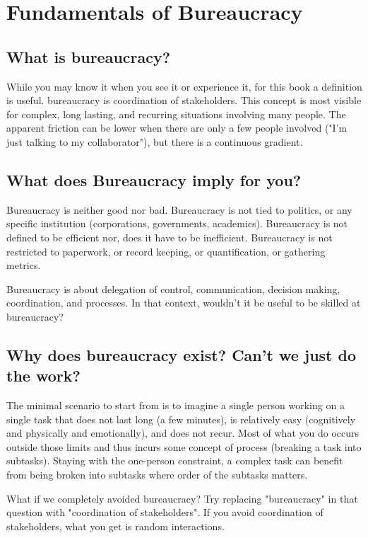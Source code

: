 \section{Fundamentals of Bureaucracy}

\subsection{What is bureaucracy?}
While you may know it when you see it or experience it, for this book a definition is useful. 
\gls{bureaucracy} is coordination of stakeholders. This concept is most visible for complex, long lasting, and recurring situations involving many people. The apparent friction can be lower when there are only a few people involved ("I'm just talking to my collaborator"), but there is a continuous gradient. 

\subsection{What does Bureaucracy imply for you?}
Bureaucracy is neither good nor bad. Bureaucracy is not tied to politics, or any specific institution (corporations, governments, academics). Bureaucracy is not defined to be efficient nor, does it have to be inefficient. Bureaucracy is not restricted to paperwork, or record keeping, or quantification, or gathering metrics. 

Bureaucracy is about delegation of control, communication, decision making, coordination, and processes. In that context, wouldn't it be useful to be skilled at bureaucracy? 

\subsection{Why does bureaucracy exist? Can't we just do the work?}

The minimal scenario to start from is to imagine a single person working on a single task that does not last long (a few minutes), is relatively easy (cognitively and physically and emotionally), and does not recur. Most of what you do occurs outside those limits and thus incurs some concept of \gls{process} (breaking a task into subtasks). Staying with the one-person constraint, a complex task can benefit from being broken into subtasks where order of the subtasks matters. 


What if we completely avoided bureaucracy? Try replacing "bureaucracy" in that question with "coordination of stakeholders". If you avoid coordination of stakeholders, what you get is random interactions. 

